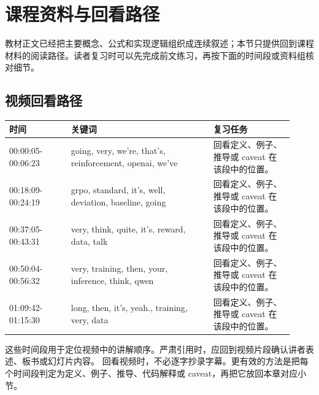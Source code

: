 \documentclass[a4paper]{article}
\begin{document}
\section{课程资料与回看路径}
教材正文已经把主要概念、公式和实现逻辑组织成连续叙述；本节只提供回到课程材料的阅读路径。读者复习时可以先完成前文练习，再按下面的时间段或资料组核对细节。
\subsection{视频回看路径}
\begin{longtable}{p{0.20\linewidth}p{0.46\linewidth}p{0.26\linewidth}}
\toprule
\textbf{时间} & \textbf{关键词} & \textbf{复习任务}\\
\midrule
00:00:05-00:06:23 & going, very, we're, that's, reinforcement, openai, we've & 回看定义、例子、推导或 caveat 在该段中的位置。\\
00:18:09-00:24:19 & grpo, standard, it's, well, deviation, baseline, going & 回看定义、例子、推导或 caveat 在该段中的位置。\\
00:37:05-00:43:31 & very, think, quite, it's, reward, data, talk & 回看定义、例子、推导或 caveat 在该段中的位置。\\
00:50:04-00:56:32 & very, training, then, your, inference, think, qwen & 回看定义、例子、推导或 caveat 在该段中的位置。\\
01:09:42-01:15:30 & long, then, it's, yeah., training, very, data & 回看定义、例子、推导或 caveat 在该段中的位置。\\
\bottomrule
\end{longtable}
这些时间段用于定位视频中的讲解顺序。严肃引用时，应回到视频片段确认讲者表述、板书或幻灯片内容。
回看视频时，不必逐字抄录字幕。更有效的方法是把每个时间段判定为定义、例子、推导、代码解释或 caveat，再把它放回本章对应小节。
\end{document}
